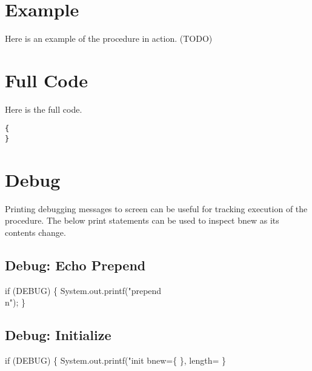 \section{Example}

Here is an example of the procedure in action. (TODO)

\section{Full Code}

Here is the full code.

\begin{verbatim}
{
}
\end{verbatim}

\section{Debug}

Printing debugging messages to screen can be useful for tracking execution of
the procedure. The below print statements can be used to inspect {\Tt{}bnew\nwendquote} as
its contents change.

\subsection{Debug: Echo Prepend}

\nwenddocs{}\endmoddef\nwstartdeflinemarkup{}\nwenddeflinemarkup
if (DEBUG) \{
  System.out.printf("prepend\\n");
\}
\nwendcode{}\nwdocspar

\subsection{Debug: Initialize}

\nwenddocs{}\endmoddef\nwstartdeflinemarkup{}\nwenddeflinemarkup
if (DEBUG) \{
  System.out.printf("init bnew=\{ \}, length=%
\}
\nwendcode{}\nwdocspar

